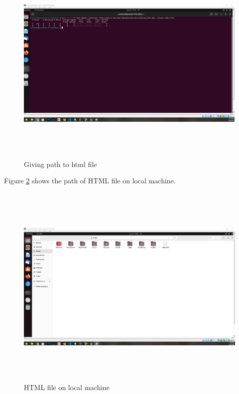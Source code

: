 \documentclass[12pt]{article}
\begin{document}
\begin{figure}[h!]
    \centering
    \includegraphics[trim=0 0 0 0, clip, width=\textwidth,height=10cm] {Q2c-1.png}
    \caption{Giving path to html file}
    \label{fig:Q2c-1}
\end{figure}

Figure \ref{fig:Q2c-2} shows the path of HTML file on local machine.

\begin{figure}[h!]
    \centering
    \includegraphics[trim=0 0 0 0, clip, width=\textwidth,height=10cm] {Q2c-2.png}
    \caption{HTML file on local machine}
    \label{fig:Q2c-2}
\end{figure}
\end{document}
